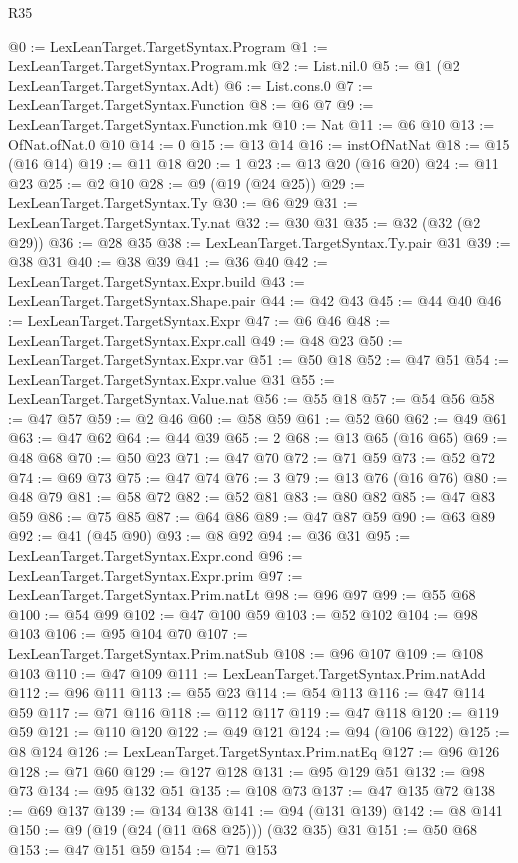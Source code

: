 \begin{lexlean}{R35}
\begin{coremodule}
@0 := LexLeanTarget.TargetSyntax.Program
@1 := LexLeanTarget.TargetSyntax.Program.mk
@2 := List.nil.{0}
@5 := @1 (@2 LexLeanTarget.TargetSyntax.Adt)
@6 := List.cons.{0}
@7 := LexLeanTarget.TargetSyntax.Function
@8 := @6 @7
@9 := LexLeanTarget.TargetSyntax.Function.mk
@10 := Nat
@11 := @6 @10
@13 := OfNat.ofNat.{0} @10
@14 := 0
@15 := @13 @14
@16 := instOfNatNat
@18 := @15 (@16 @14)
@19 := @11 @18
@20 := 1
@23 := @13 @20 (@16 @20)
@24 := @11 @23
@25 := @2 @10
@28 := @9 (@19 (@24 @25))
@29 := LexLeanTarget.TargetSyntax.Ty
@30 := @6 @29
@31 := LexLeanTarget.TargetSyntax.Ty.nat
@32 := @30 @31
@35 := @32 (@32 (@2 @29))
@36 := @28 @35
@38 := LexLeanTarget.TargetSyntax.Ty.pair @31
@39 := @38 @31
@40 := @38 @39
@41 := @36 @40
@42 := LexLeanTarget.TargetSyntax.Expr.build
@43 := LexLeanTarget.TargetSyntax.Shape.pair
@44 := @42 @43
@45 := @44 @40
@46 := LexLeanTarget.TargetSyntax.Expr
@47 := @6 @46
@48 := LexLeanTarget.TargetSyntax.Expr.call
@49 := @48 @23
@50 := LexLeanTarget.TargetSyntax.Expr.var
@51 := @50 @18
@52 := @47 @51
@54 := LexLeanTarget.TargetSyntax.Expr.value @31
@55 := LexLeanTarget.TargetSyntax.Value.nat
@56 := @55 @18
@57 := @54 @56
@58 := @47 @57
@59 := @2 @46
@60 := @58 @59
@61 := @52 @60
@62 := @49 @61
@63 := @47 @62
@64 := @44 @39
@65 := 2
@68 := @13 @65 (@16 @65)
@69 := @48 @68
@70 := @50 @23
@71 := @47 @70
@72 := @71 @59
@73 := @52 @72
@74 := @69 @73
@75 := @47 @74
@76 := 3
@79 := @13 @76 (@16 @76)
@80 := @48 @79
@81 := @58 @72
@82 := @52 @81
@83 := @80 @82
@85 := @47 @83 @59
@86 := @75 @85
@87 := @64 @86
@89 := @47 @87 @59
@90 := @63 @89
@92 := @41 (@45 @90)
@93 := @8 @92
@94 := @36 @31
@95 := LexLeanTarget.TargetSyntax.Expr.cond
@96 := LexLeanTarget.TargetSyntax.Expr.prim
@97 := LexLeanTarget.TargetSyntax.Prim.natLt
@98 := @96 @97
@99 := @55 @68
@100 := @54 @99
@102 := @47 @100 @59
@103 := @52 @102
@104 := @98 @103
@106 := @95 @104 @70
@107 := LexLeanTarget.TargetSyntax.Prim.natSub
@108 := @96 @107
@109 := @108 @103
@110 := @47 @109
@111 := LexLeanTarget.TargetSyntax.Prim.natAdd
@112 := @96 @111
@113 := @55 @23
@114 := @54 @113
@116 := @47 @114 @59
@117 := @71 @116
@118 := @112 @117
@119 := @47 @118
@120 := @119 @59
@121 := @110 @120
@122 := @49 @121
@124 := @94 (@106 @122)
@125 := @8 @124
@126 := LexLeanTarget.TargetSyntax.Prim.natEq
@127 := @96 @126
@128 := @71 @60
@129 := @127 @128
@131 := @95 @129 @51
@132 := @98 @73
@134 := @95 @132 @51
@135 := @108 @73
@137 := @47 @135 @72
@138 := @69 @137
@139 := @134 @138
@141 := @94 (@131 @139)
@142 := @8 @141
@150 := @9 (@19 (@24 (@11 @68 @25))) (@32 @35) @31
@151 := @50 @68
@153 := @47 @151 @59
@154 := @71 @153

\end{coremodule}
\end{lexlean}
